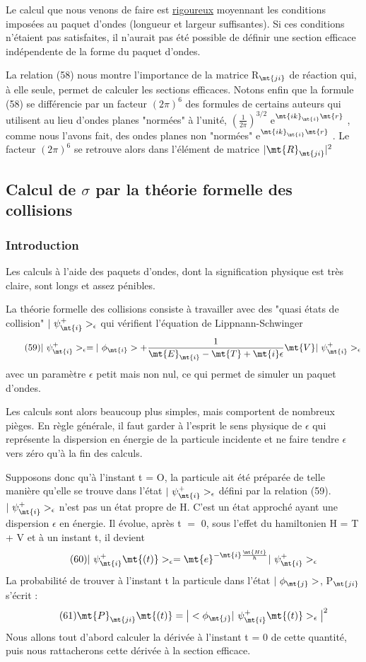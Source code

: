 Le calcul que nous venons de faire est \ul{rigoureux} moyennant les
conditions imposées au paquet d'ondes (longueur et largeur suffisantes).
Si ces conditions n'étaient pas satisfaites, il n'aurait pas été possible de
définir une section efficace indépendente de la forme du paquet d'ondes.

La relation (58) nous montre l'importance de la matrice R$_\mt{ji}$ de
réaction qui, à elle seule, permet de calculer les sections efficaces.
Notons enfin que la formule (58) se différencie par un facteur $(2\pi)^6$ des formules de
certains auteurs qui utilisent au lieu d'ondes planes "normées" à
l'unité,  $(\frac{1}{2\pi})^{3/2}$ e$^{\mt{i k}_\mt{i}\mt{ r}}$ , comme nous l'avons fait, des ondes planes non
"normées" e$^{\mt{i k}_\mt{i}\mt{ r}}$ . Le facteur $(2\pi)^6$ se retrouve alors dans l'élément de
matrice $|\mt{R}_\mt{ji}|^2$

\subsection{Calcul de $\sigma$ par la théorie formelle des collisions}%
\subsubsection{Introduction}%
Les calculs à l'aide des paquets d'ondes,
dont la signification physique est très claire, sont longs et assez pénibles.

La théorie formelle des collisions consiste à travailler avec
des "quasi états de collision" $|\ \psi_\mt{i}^+>_\epsilon$ qui vérifient l'équation de
Lippnann-Schwinger
\[
\tag{59}|\ \psi_\mt{i}^+>_\epsilon=|\ \phi_\mt{i}>+\frac{1}{\mt{E}_\mt{i}-\mt{T}+\mt{i}\epsilon}
\mt{ V }|\ \psi_\mt{i}^+>_\epsilon
\]
avec un paramètre $\epsilon$ petit mais non nul, ce qui permet de simuler un paquet
d'ondes.

Les calculs sont alors beaucoup plus simples, mais comportent de
nombreux pièges. En règle générale, il faut garder à l'esprit le sens physique
de $\epsilon$ qui représente la dispersion en énergie de la particule incidente
et ne faire tendre $\epsilon$ vers zéro qu'à la fin des calculs.

Supposons donc qu'à l'instant t = O, la particule ait été préparée
de telle manière qu'elle se trouve dans l'état $|\ \psi_\mt{i}^+>_\epsilon$ défini par la relation (59).
$|\ \psi_\mt{i}^+>_\epsilon$ n'est pas un état propre de H. C'est un état approché
ayant une dispersion $\epsilon$ en énergie. Il évolue, après t $=$ 0, sous l'effet du
hamiltonien H = T + V et à un instant t, il devient
\[
\tag{60}|\ \psi_\mt{i}^+\mt{(t)}>_\epsilon=\mt{e}^{-\mt{i}\frac{\mt{Ht}}{\hbar}}|\ \psi_\mt{i}^+>_\epsilon
\]
La probabilité de trouver à l'instant t la particule dans l'état $|\ \phi_\mt{j}>$, P$_\mt{ji}$
 s'écrit :
\[
\tag{61}\mt{P}_\mt{ji}\mt{(t)}=\big|<\phi_\mt{j }|\ \psi_\mt{i}^+\mt{(t)}>_\epsilon\big|^2
\]
Nous allons tout d'abord calculer la dérivée à l'instant t = 0 de cette
quantité, puis nous rattacherons cette dérivée à la section efficace.
